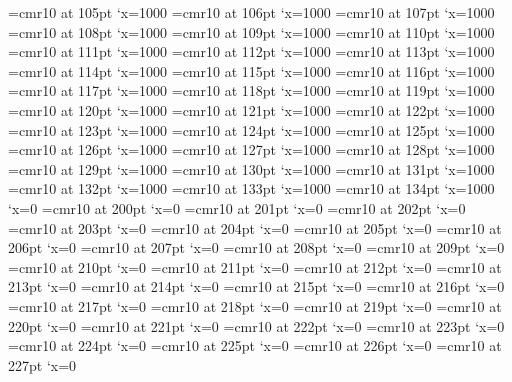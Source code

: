 \font\FADW=cmr10 at 105pt \efcode\FADW`x=1000
\font\FADX=cmr10 at 106pt \efcode\FADX`x=1000
\font\FADY=cmr10 at 107pt \efcode\FADY`x=1000
\font\FADZ=cmr10 at 108pt \efcode\FADZ`x=1000
\font\FAEA=cmr10 at 109pt \efcode\FAEA`x=1000
\font\FAEB=cmr10 at 110pt \efcode\FAEB`x=1000
\font\FAEC=cmr10 at 111pt \efcode\FAEC`x=1000
\font\FAED=cmr10 at 112pt \efcode\FAED`x=1000
\font\FAEE=cmr10 at 113pt \efcode\FAEE`x=1000
\font\FAEF=cmr10 at 114pt \efcode\FAEF`x=1000
\font\FAEG=cmr10 at 115pt \efcode\FAEG`x=1000
\font\FAEH=cmr10 at 116pt \efcode\FAEH`x=1000
\font\FAEI=cmr10 at 117pt \efcode\FAEI`x=1000
\font\FAEJ=cmr10 at 118pt \efcode\FAEJ`x=1000
\font\FAEK=cmr10 at 119pt \efcode\FAEK`x=1000
\font\FAEL=cmr10 at 120pt \efcode\FAEL`x=1000
\font\FAEM=cmr10 at 121pt \efcode\FAEM`x=1000
\font\FAEN=cmr10 at 122pt \efcode\FAEN`x=1000
\font\FAEO=cmr10 at 123pt \efcode\FAEO`x=1000
\font\FAEP=cmr10 at 124pt \efcode\FAEP`x=1000
\font\FAEQ=cmr10 at 125pt \efcode\FAEQ`x=1000
\font\FAER=cmr10 at 126pt \efcode\FAER`x=1000
\font\FAES=cmr10 at 127pt \efcode\FAES`x=1000
\font\FAET=cmr10 at 128pt \efcode\FAET`x=1000
\font\FAEU=cmr10 at 129pt \efcode\FAEU`x=1000
\font\FAEV=cmr10 at 130pt \efcode\FAEV`x=1000
\font\FAEW=cmr10 at 131pt \efcode\FAEW`x=1000
\font\FAEX=cmr10 at 132pt \efcode\FAEX`x=1000
\font\FAEY=cmr10 at 133pt \efcode\FAEY`x=1000
\font\FAEZ=cmr10 at 134pt \efcode\FAEZ`x=1000
\knbscode\nullfont`x=0
\font\FBMM=cmr10 at 200pt \lpcode\FBMM`x=0
\font\FBMN=cmr10 at 201pt \lpcode\FBMN`x=0
\font\FBMO=cmr10 at 202pt \lpcode\FBMO`x=0
\font\FBMP=cmr10 at 203pt \lpcode\FBMP`x=0
\font\FBMQ=cmr10 at 204pt \lpcode\FBMQ`x=0
\font\FBMR=cmr10 at 205pt \lpcode\FBMR`x=0
\font\FBMS=cmr10 at 206pt \lpcode\FBMS`x=0
\font\FBMT=cmr10 at 207pt \lpcode\FBMT`x=0
\font\FBMU=cmr10 at 208pt \lpcode\FBMU`x=0
\font\FBMV=cmr10 at 209pt \lpcode\FBMV`x=0
\font\FBMW=cmr10 at 210pt \lpcode\FBMW`x=0
\font\FBMX=cmr10 at 211pt \lpcode\FBMX`x=0
\font\FBMY=cmr10 at 212pt \lpcode\FBMY`x=0
\font\FBMZ=cmr10 at 213pt \lpcode\FBMZ`x=0
\font\FBNA=cmr10 at 214pt \lpcode\FBNA`x=0
\font\FBNB=cmr10 at 215pt \lpcode\FBNB`x=0
\font\FBNC=cmr10 at 216pt \lpcode\FBNC`x=0
\font\FBND=cmr10 at 217pt \lpcode\FBND`x=0
\font\FBNE=cmr10 at 218pt \lpcode\FBNE`x=0
\font\FBNF=cmr10 at 219pt \lpcode\FBNF`x=0
\font\FBNG=cmr10 at 220pt \lpcode\FBNG`x=0
\font\FBNH=cmr10 at 221pt \lpcode\FBNH`x=0
\font\FBNI=cmr10 at 222pt \lpcode\FBNI`x=0
\font\FBNJ=cmr10 at 223pt \lpcode\FBNJ`x=0
\font\FBNK=cmr10 at 224pt \lpcode\FBNK`x=0
\font\FBNL=cmr10 at 225pt \lpcode\FBNL`x=0
\font\FBNM=cmr10 at 226pt \lpcode\FBNM`x=0
\font\FBNN=cmr10 at 227pt \lpcode\FBNN`x=0
